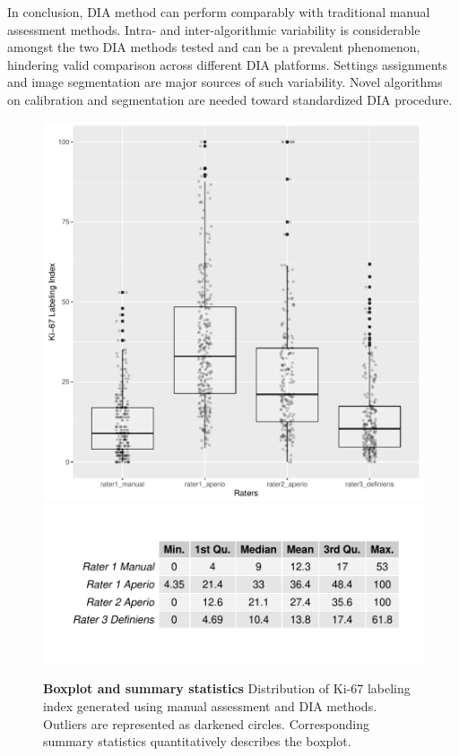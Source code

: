 \documentclass[final,5p,times,twocolumn]{elsarticle}
\begin{document}
In conclusion, DIA method can perform comparably with traditional manual assessment methods. Intra- and inter-algorithmic variability is considerable amongst the two DIA methods tested and can be a prevalent phenomenon, hindering valid comparison across different DIA platforms. Settings assignments and image segmentation are major sources of such variability. Novel algorithms on calibration and segmentation are needed toward standardized DIA procedure.



\printbibliography

\newpage

\begin{figure}
\centering
\includegraphics[width = 0.7\linewidth]{boxplot}
\includegraphics[width = \linewidth]{boxStat}

\centering
\caption{{\bf Boxplot and summary statistics}
Distribution of Ki-67 labeling index generated using manual assessment and DIA methods. Outliers are represented as darkened circles. Corresponding summary statistics quantitatively describes the boxplot.
}
\label{boxplot}
\end{figure}
\end{document}
